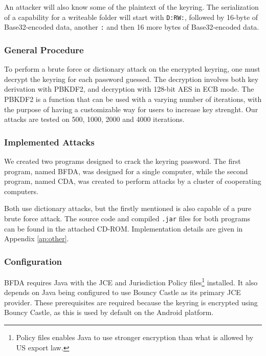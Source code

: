 \documentclass[pdftex,english,10pt,b5paper,twoside]{book}
\begin{document}
An attacker will also know some of the plaintext of the keyring. The
serialization of a capability for a writeable folder will
start with \texttt{D:RW:}, followed by 16-byte of Base32-encoded data, another
\texttt{:} and then 16 more bytes of Base32-encoded data.

\subsubsection{General Procedure}

To perform a brute force or dictionary attack on the encrypted keyring, one
must decrypt the keyring for each password guessed. The decryption involves
both key derivation with \ac{PBKDF2}, and decryption with 128-bit \ac{AES} in
\ac{ECB} mode. The \ac{PBKDF2} is a function that can be used with a
varying number of iterations, with the purpose of having a customizable way for
users to increase key strenght. Our attacks are tested on 500, 1000, 2000 and
4000 iterations.


\subsubsection{Implemented Attacks}

We created two programs designed to crack the keyring password. The first
program, named \ac{BFDA}, was designed for a single computer, while the second
program, named \ac{CDA}, was created to perform attacks by a cluster of
cooperating computers.

Both use dictionary attacks, but the firstly mentioned is also capable of a
pure brute force attack. The source code and compiled \texttt{.jar} files for
both programs can be found in the attached CD-ROM. Implementation details are
given in Appendix \ref{ap:other}.

\subsubsection{Configuration}

\ac{BFDA} requires Java with the \ac{JCE} and Jurisdiction Policy
files\footnote{Policy files enables Java to use stronger encryption than what
is allowed by US export law.} installed. It also depends on Java being
configured to use Bouncy Castle as its primary \ac{JCE} provider. These
prerequisites are required because the keyring is encrypted using Bouncy
Castle, as this is used by default on the Android platform.
\end{document}
